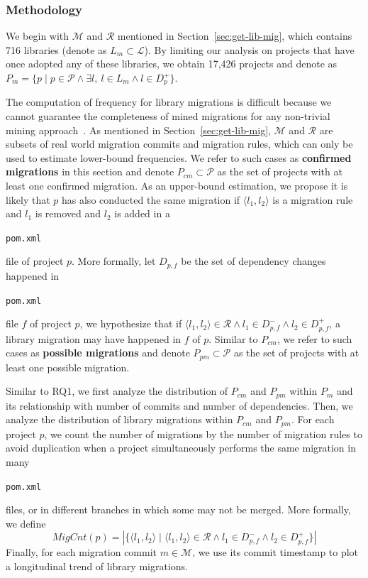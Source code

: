 \documentclass[sigconf, screen]{acmart}
\newcommand{\Code}[1]{\begin{small}\texttt{#1}\end{small}}
\begin{document}
\subsubsection{Methodology}

We begin with $\mathcal{M}$ and $\mathcal{R}$ mentioned in Section~\ref{sec:get-lib-mig}, which contains 716 libraries (denote as $L_m \subset \mathcal{L}$).
By limiting our analysis on projects that have once adopted any of these libraries, we obtain 17,426 projects and denote as $P_m = \{p \mid p \in \mathcal{P} \land \exists l,\ l \in L_m \land l \in D_p^+\}$.

The computation of frequency for library migrations is difficult because we cannot guarantee the completeness of mined migrations for any non-trivial mining approach~\cite{teyton2012mining, he2021multi}.
As mentioned in Section~\ref{sec:get-lib-mig}, $\mathcal{M}$ and $\mathcal{R}$ are subsets of real world migration commits and migration rules, which can only be used to estimate lower-bound frequencies.
We refer to such cases as \textbf{confirmed migrations} in this section and denote $P_{cm}\subset \mathcal{P}$ as the set of projects with at least one confirmed migration.
As an upper-bound estimation, we propose it is likely that $p$ has also conducted the same migration if $\langle l_1, l_2 \rangle$ is a migration rule and $l_1$ is removed and $l_2$ is added in a \Code{pom.xml} file of project $p$.
More formally, let $D_{p,f}$ be the set of dependency changes happened in \Code{pom.xml} file $f$ of project $p$, we hypothesize that if $\langle l_1, l_2 \rangle \in \mathcal{R} \land l_1\in D_{p,f}^- \land l_2 \in D_{p,f}^+$, a library migration may have happened in $f$ of $p$.
Similar to $P_{cm}$, we refer to such cases as \textbf{possible migrations} and denote $P_{pm} \subset \mathcal{P}$ as the set of projects with at least one possible migration.

Similar to RQ1, we first analyze the distribution of $P_{cm}$ and $P_{pm}$ within $P_m$ and its relationship with number of commits and number of dependencies.
Then, we analyze the distribution of library migrations within $P_{cm}$ and $P_{pm}$.
For each project $p$, we count the number of migrations by the number of migration rules to avoid duplication when a project simultaneously performs the same migration in many \Code{pom.xml} files, or in different branches in which some may not be merged.
More formally, we define
\begin{equation}
\label{eq:migcount}
   MigCnt(p) = |\{\langle l_1,l_2 \rangle \mid \langle l_1, l_2 \rangle \in \mathcal{R} \land l_1 \in D_{p,f}^- \land l_2 \in D_{p,f}^+\}|
\end{equation}
Finally, for each migration commit $m \in \mathcal{M}$, we use its commit timestamp to plot a longitudinal trend of library migrations.
\end{document}
